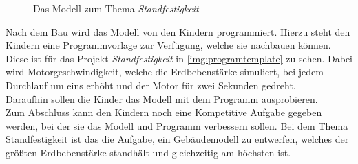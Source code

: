 \begin{figure}[htbp!]
	\centering
	\caption[Das Modell zum Thema Standfestigkeit]{Das Modell zum Thema \textit{Standfestigkeit}}
	\label{img:subject}
\end{figure} 

Nach dem Bau wird das Modell von den Kindern programmiert. Hierzu steht den Kindern eine Programmvorlage zur Verfügung, welche sie nachbauen können. Diese ist für das Projekt \textit{Standfestigkeit} in \ref{img:programtemplate} zu sehen. Dabei wird Motorgeschwindigkeit, welche die Erdbebenstärke simuliert, bei jedem Durchlauf um eins erhöht und der Motor für zwei Sekunden gedreht.\\
Daraufhin sollen die Kinder das Modell mit dem Programm ausprobieren.\\
Zum Abschluss kann den Kindern noch eine Kompetitive Aufgabe gegeben werden, bei der sie das Modell und Programm verbessern sollen. Bei dem Thema Standfestigkeit ist das die Aufgabe, ein Gebäudemodell zu entwerfen, welches der größten Erdbebenstärke standhält und gleichzeitig am höchsten ist.

